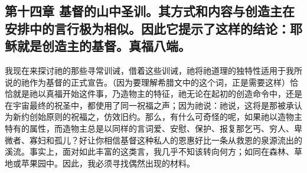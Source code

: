 
\subsection{第十四章 基督的山中圣训。其方式和内容与创造主在安排中的言行极为相似。因此它提示了这样的结论：耶稣就是创造主的基督。真福八端。}

我现在来探讨祂的那些寻常训诫，借着这些训诫，祂将祂道理的独特性适用于我所说的祂作为基督的正式宣告。（因为要理解希腊文中的这个词，正是需要这样）恰恰就是祂以真福开始这件事，乃造物主的特征，祂无论在起初的创造命令中，还是在宇宙最终的祝圣中，都使用了同一祝福之声；因为祂说：祂说，这将是那被承认为新约创始原则的祝福之，仿效旧约。那么，有什么可奇怪的呢，如果祂以造物主特有的属性，而造物主总是以同样的言词爱、安慰、保护、报复那乞丐、穷人、卑微者、寡妇和孤儿？好让你相信基督这种私人的恩惠好比一条从救恩的泉源流出的溪流。事实上，面对如此丰富的这类言，我几乎不知该转向何方；如同在森林、草地或苹果园中。因此，我必须寻找偶然出现的材料。\par

